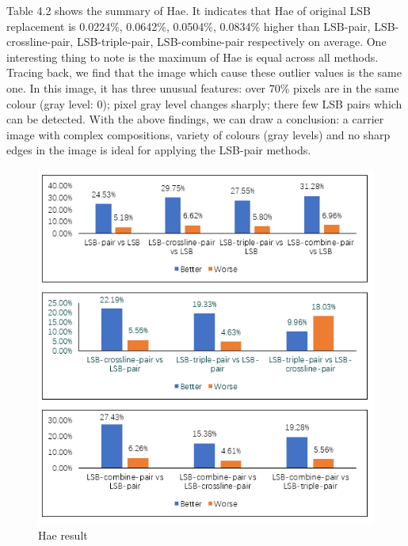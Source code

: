 Table 4.2 shows the summary of Hae. It indicates that Hae of original LSB replacement is 0.0224\%, 0.0642\%, 0.0504\%, 0.0834\% higher than LSB-pair, LSB-crossline-pair, LSB-triple-pair, LSB-combine-pair respectively on average. One interesting thing to note is the maximum of Hae is equal across all methods. Tracing back, we find that the image which cause these outlier values is the same one. In this image, it has three unusual features: over 70\% pixels are in the same colour (gray level: 0); pixel gray level changes sharply; there few LSB pairs which can be detected. With the above findings, we can draw a conclusion: a carrier image with complex compositions, variety of colours (gray levels) and no sharp edges in the image is ideal for applying the LSB-pair methods.

\begin{figure}[h]
\includegraphics[width=\columnwidth]{image/Hae.PNG}
\caption{Hae result}
\label{fig:figure}
\end{figure} 



